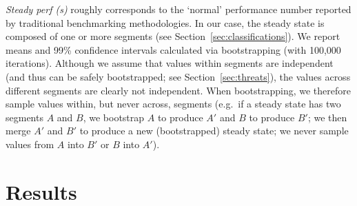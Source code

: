 \documentclass[acmsmall]{acmart}\settopmatter{printfolios=true}
\begin{document}
\emph{Steady perf (s)} roughly corresponds to the `normal' performance number reported by
traditional benchmarking methodologies. In our case, the steady state is composed of one or more
segments (see Section~\ref{sec:classifications}). We report means and
99\% confidence intervals
calculated via bootstrapping (with 100,000 iterations). Although we
assume that values within segments are
independent (and thus can be safely bootstrapped; see Section~\ref{sec:threats}), the values across different segments are clearly not
independent. When bootstrapping, we therefore sample values within, but never
across, segments (e.g.~if a
steady state has two segments $A$ and $B$, we bootstrap $A$ to produce $A'$ and
$B$ to produce $B'$; we then merge $A'$ and $B'$ to produce a new (bootstrapped)
steady state; we never sample values from $A$ into $B'$ or $B$ into $A'$).


\section{Results}
\label{sec:results}
\end{document}
